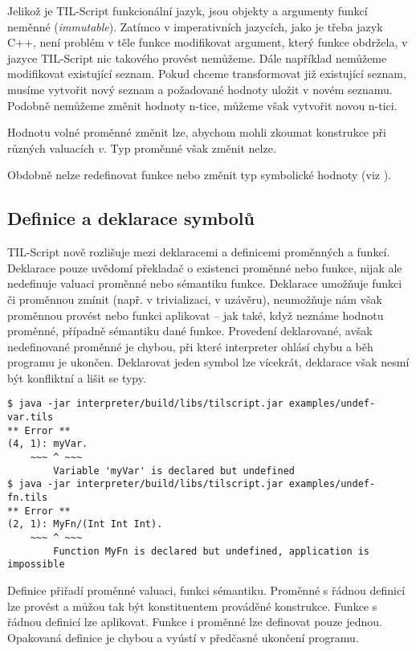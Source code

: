 Jelikož je TIL-Script funkcionální jazyk, jsou objekty a argumenty funkcí neměnné
(\textit{immutable}). Zatímco v imperativních jazycích, jako je třeba jazyk C++, není problém
v těle funkce modifikovat argument, který funkce obdržela, v jazyce TIL-Script nic takového provést
nemůžeme. Dále například nemůžeme modifikovat existující seznam. Pokud chceme transformovat již
existující seznam, musíme vytvořit nový seznam a požadované hodnoty uložit v novém seznamu. Podobně
nemůžeme změnit hodnoty n-tice, můžeme však vytvořit novou n-tici.

Hodnotu volné proměnné změnit lze, abychom mohli zkoumat konstrukce při různých valuacích $v$.
Typ proměnné však změnit nelze.

Obdobně nelze redefinovat funkce nebo změnit typ symbolické hodnoty
(viz ).

\subsection{Definice a deklarace symbolů}

TIL-Script nově rozlišuje mezi deklaracemi a definicemi proměnných a funkcí. Deklarace pouze
uvědomí překladač o existenci proměnné nebo funkce, nijak ale nedefinuje valuaci proměnné nebo
sémantiku funkce. Deklarace umožňuje funkci či proměnnou zmínit (např. v trivializaci, v uzávěru),
neumožňuje nám však proměnnou provést nebo funkci aplikovat -- jak také, když neznáme hodnotu
proměnné, případně sémantiku dané funkce. Provedení deklarované, avšak nedefinované proměnné
je chybou, při které interpreter ohlásí chybu a běh programu je ukončen. Deklarovat jeden symbol
lze vícekrát, deklarace však nesmí být konfliktní a lišit se typy.

\begin{lstlisting}[caption={Hlášení chyby při chybějící definici}]
$ java -jar interpreter/build/libs/tilscript.jar examples/undef-var.tils
** Error **
(4, 1): myVar.
    ~~~ ^ ~~~
        Variable 'myVar' is declared but undefined
$ java -jar interpreter/build/libs/tilscript.jar examples/undef-fn.tils
** Error **
(2, 1): MyFn/(Int Int Int).
    ~~~ ^ ~~~
        Function MyFn is declared but undefined, application is impossible
\end{lstlisting}

Definice přiřadí proměnné valuaci, funkci sémantiku. Proměnné s řádnou definicí lze provést
a můžou tak být konstituentem prováděné konstrukce. Funkce s řádnou definicí lze aplikovat. Funkce
i proměnné lze definovat pouze jednou. Opakovaná definice je chybou a vyústí v předčasné ukončení
programu.

